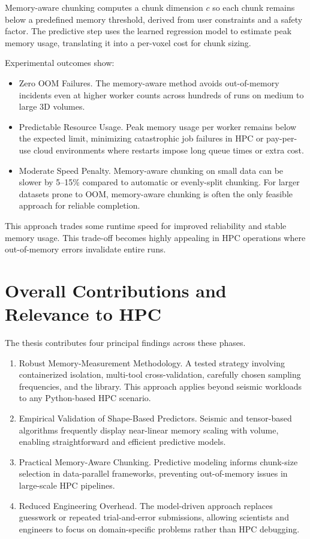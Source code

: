 Memory-aware chunking computes a chunk dimension \(c\) so each chunk remains below a predefined memory threshold, derived from user constraints and a safety factor.
The predictive step uses the learned regression model to estimate peak memory usage, translating it into a per-voxel cost for chunk sizing.

Experimental outcomes show:
\begin{itemize}
    \item Zero \ac{OOM} Failures.
    The memory-aware method avoids out-of-memory incidents even at higher worker counts across hundreds of runs on medium to large \ac{3D} volumes.
    \item Predictable Resource Usage.
    Peak memory usage per worker remains below the expected limit, minimizing catastrophic job failures in HPC or pay-per-use cloud environments where restarts impose long queue times or extra cost.
    \item Moderate Speed Penalty.
    Memory-aware chunking on small data can be slower by 5--15\% compared to automatic or evenly-split chunking.
    For larger datasets prone to \ac{OOM}, memory-aware chunking is often the only feasible approach for reliable completion.
\end{itemize}

This approach trades some runtime speed for improved reliability and stable memory usage.
This trade-off becomes highly appealing in HPC operations where out-of-memory errors invalidate entire runs.


\section{Overall Contributions and Relevance to HPC}
\label{sec:conc-contributions}

The thesis contributes four principal findings across these phases.
\begin{enumerate}
    \item Robust Memory-Measurement Methodology.
    A tested strategy involving containerized isolation, multi-tool cross-validation, carefully chosen sampling frequencies, and the \traceq library.
    This approach applies beyond seismic workloads to any Python-based \ac{HPC} scenario.
    \item Empirical Validation of Shape-Based Predictors.
    Seismic and tensor-based algorithms frequently display near-linear memory scaling with volume, enabling straightforward and efficient predictive models.
    \item Practical Memory-Aware Chunking.
    Predictive modeling informs chunk-size selection in data-parallel frameworks, preventing out-of-memory issues in large-scale \ac{HPC} pipelines.
    \item Reduced Engineering Overhead.
    The model-driven approach replaces guesswork or repeated trial-and-error submissions, allowing scientists and engineers to focus on domain-specific problems rather than \ac{HPC} debugging.
\end{enumerate}



